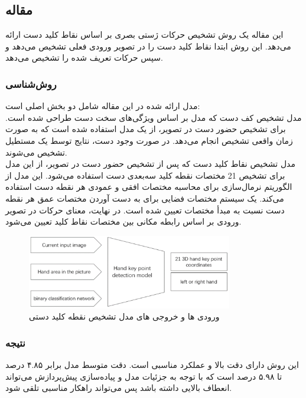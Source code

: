 \cite{dang2022improved}


\subsection{مقاله }
این مقاله یک روش تشخیص حرکات ژستی بصری بر اساس نقاط کلید دست ارائه می‌دهد. این روش ابتدا نقاط کلید دست را در تصویر ورودی فعلی تشخیص می‌دهد و سپس حرکات تعریف شده را تشخیص می‌دهد.

\subsubsection{روش‌شناسی}
مدل ارائه شده در این مقاله شامل دو بخش اصلی است: 
\\
مدل تشخیص کف دست که مدل بر اساس ویژگی‌های سخت دست طراحی شده است. برای تشخیص حضور دست در تصویر، از یک مدل  استفاده شده است که به صورت زمان
واقعی تشخیص انجام می‌دهد. در صورت وجود دست، نتایج توسط یک مستطیل تشخیص می‌شوند.
\\
مدل تشخیص نقاط کلید دست که پس از تشخیص حضور دست در تصویر، از این مدل برای تشخیص 21 مختصات نقطه کلید سه‌بعدی دست استفاده می‌شود.  این مدل از الگوریتم نرمال‌سازی برای محاسبه مختصات افقی و عمودی هر نقطه 
دست استفاده می‌کند. یک سیستم مختصات فضایی برای به دست آوردن مختصات عمق هر نقطه دست نسبت به مبدأ مختصات تعیین شده است. در نهایت، معنای حرکات در تصویر ورودی بر اساس رابطه مکانی بین مختصات نقاط کلید تعیین می‌شود.

\begin{figure}[h]
    \centering
    \includegraphics[width=0.8\textwidth]{keypoint.png}
    \caption{ورودی ها و خروجی های مدل تشخیص نقطه کلید دستی}
\end{figure}

\subsubsection{نتیجه}
این روش دارای دقت بالا و عملکرد مناسبی است. دقت متوسط مدل برابر  ۴.۸۵ درصد تا ۵.۹۸ درصد است که با توجه به جزئیات مدل و پیاده‌سازی پیش‌پردازش می‌تواند انعطاف بالایی داشته باشد پس می‌تواند راهکار مناسبی تلقی شود.



